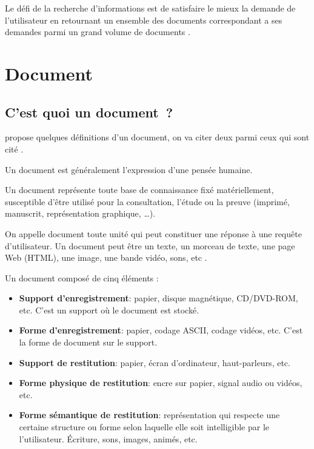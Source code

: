 Le défi de la recherche d'informations est de satisfaire le mieux la demande de l'utilisateur en retournant un ensemble des documents correspondant a ses demandes parmi un grand volume de documents \citep{amelioration-ri-approche-semantique}.

\section{Document}
\subsection{C'est quoi un document~?}
\citeauthor{thesaurus-ir-web} propose quelques définitions d'un document, on va citer deux parmi ceux qui sont cité \citep{thesaurus-ir-web}.

\begin{definition}
    Un document est généralement l'expression d'une pensée humaine.
\end{definition}

\begin{definition}
    Un document représente toute base de connaissance fixé matériellement, susceptible d'être utilisé pour la consultation, l'étude ou la preuve (imprimé, manuscrit, représentation graphique, \dots).
\end{definition}

\begin{definition}
    On appelle document toute unité qui peut constituer une réponse à une requête d'utilisateur. Un document peut être un texte, un morceau de texte, une page Web (HTML), une image, une bande vidéo, sons, etc \citep{salton1989automatique}.
\end{definition}

Un document composé de cinq éléments \citep{thesaurus-ir-web}:
\begin{itemize}
    \item \textbf{Support d'enregistrement}: papier, disque magnétique, CD/DVD-ROM, etc. C'est un support où le document est stocké.
    \item \textbf{Forme d'enregistrement}: papier, codage ASCII, codage vidéos, etc. C'est la forme de document sur le support.
    \item \textbf{Support de restitution}: papier, écran d'ordinateur, haut-parleurs, etc.
    \item \textbf{Forme physique de restitution}: encre sur papier, signal audio ou vidéos, etc.
    \item \textbf{Forme sémantique de restitution}: représentation qui respecte une certaine structure ou forme selon laquelle elle soit intelligible par le l'utilisateur. Écriture, sons, images, animés, etc.
\end{itemize}


